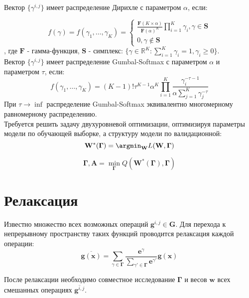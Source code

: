 \documentclass[12pt,twoside]{article}
\begin{document}
Вектор $\{{\gamma}^{i,j}\}$ имеет распределение Дирихле с параметром $\alpha$, если:

\[
f(\gamma) = f(\gamma_1, \dots,\gamma_K) = 
\begin{cases}
\frac{\boldsymbol{F} (K\times\alpha)}{{\boldsymbol{F}(\alpha)}^{K}}\prod\limits_{i = 1}^K\gamma_i,\gamma \in \boldsymbol{S}
\\
0, \gamma\notin \boldsymbol{S}
\end{cases}
\],
где $\boldsymbol{F}$ - гамма-функция, $\boldsymbol{S}$ - симплекс: $\{\gamma \in \mathbb{R}^K: \sum_{i=1}^K \gamma_i = 1, \gamma_i \geqslant 0\}$.
\\

Вектор $\{{\gamma}^{i,j}\}$ имеет распределение Gumbal-Softmax с параметром $\alpha$ и параметром $\tau$, если:
\[
f(\gamma_1, \dots,\gamma_K) = (K-1)!\tau^{K-1}\alpha^K\prod\limits_{i = 1}^K\frac{\gamma_i^{-\tau - 1}}{\alpha\sum_{j=1}^K\gamma_j^{-\tau}}
\]
При $\tau\to\inf$ распределение Gumbal-Softmax эквивалентно многомерному равномерному распределению.
\\

Требуется решить задачу двухуровневой оптимизации, оптимизируя параметры модели по обучающей выборке, а структуру модели по валидационной: 
\[
\mathbf{W}^*( \boldsymbol{\Gamma}) = \argmin_{\mathbf{W}}
L (\mathbf{W}, \boldsymbol{\Gamma})\]

\[
\boldsymbol{\Gamma}, \mathbf{A} = \min_{\boldsymbol{\Gamma}} Q (\mathbf{W}^*( \boldsymbol{\Gamma}), \boldsymbol{\Gamma})
\]

\section{Релаксация}
Известно множество всех возможных операций $\mathbf{g}^{i,j} \in \mathbf{G}$. Для перехода к непрерывному пространству таких функций проводится релаксация каждой операции:
\[
\overline{\mathbf{g}(\mathbf{x})} = \sum_{\gamma \in  \boldsymbol{\Gamma}} \frac{\boldsymbol{e}^{\gamma}}{\sum_{\gamma' \in  \boldsymbol{\Gamma}}\boldsymbol{e}^{\gamma'}}\mathbf{g}(\mathbf{x})
\]

После релаксации необходимо совместное исследование $\boldsymbol{\Gamma}$ и весов $\boldsymbol{w}$ всех смешанных операциях $\overline{\mathbf{g}^{i,j}}$.




\end{document}
